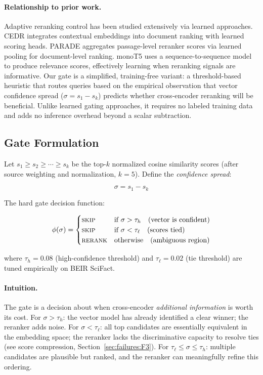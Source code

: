 \documentclass[11pt]{article}
\begin{document}
\paragraph{Relationship to prior work.}
Adaptive reranking control has been studied extensively via learned approaches.
CEDR \citep{macavaney2019cedr} integrates contextual embeddings into document ranking
with learned scoring heads. PARADE \citep{yan2021parade} aggregates passage-level
reranker scores via learned pooling for document-level ranking.
monoT5 \citep{nogueira2020monot5} uses a sequence-to-sequence model to produce
relevance scores, effectively learning when reranking signals are informative.
Our gate is a simplified, training-free variant: a threshold-based heuristic that routes
queries based on the empirical observation that vector confidence spread ($\sigma = s_1 - s_k$)
predicts whether cross-encoder reranking will be beneficial. Unlike learned gating approaches,
it requires no labeled training data and adds no inference overhead beyond a scalar subtraction.

\subsection{Gate Formulation}

Let $s_1 \geq s_2 \geq \cdots \geq s_k$ be the top-$k$ normalized cosine similarity
scores (after source weighting and normalization, $k=5$). Define the
\emph{confidence spread}:

\begin{equation}
  \sigma = s_1 - s_k
  \label{eq:spread}
\end{equation}

The hard gate decision function:

\begin{equation}
  \phi(\sigma) = \begin{cases}
    \textsc{skip} & \text{if } \sigma > \tau_h \quad \text{(vector is confident)}\\
    \textsc{skip} & \text{if } \sigma < \tau_\ell \quad \text{(scores tied)}\\
    \textsc{rerank} & \text{otherwise} \quad \text{(ambiguous region)}
  \end{cases}
  \label{eq:gate}
\end{equation}

where $\tau_h = 0.08$ (high-confidence threshold) and $\tau_\ell = 0.02$ (tie threshold)
are tuned empirically on BEIR SciFact.

\paragraph{Intuition.}
The gate is a decision about when cross-encoder \emph{additional information} is worth its
cost. For $\sigma > \tau_h$: the vector model has already identified a clear winner; the
reranker adds noise. For $\sigma < \tau_\ell$: all top candidates are essentially
equivalent in the embedding space; the reranker lacks the discriminative capacity to
resolve ties (see score compression, Section~\ref{sec:failures:F3}). For $\tau_\ell
\leq \sigma \leq \tau_h$: multiple candidates are plausible but ranked, and the
reranker can meaningfully refine this ordering.
\end{document}
